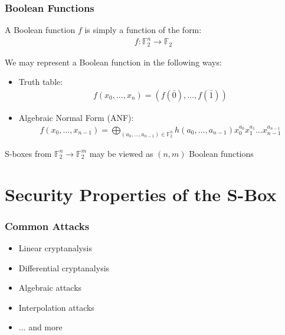 \documentclass[handout,10pt]{beamer}
\begin{document}
\begin{frame}
	\frametitle{Boolean Functions}
	A Boolean function $f$ is simply a function of the form:
	\begin{align*}
		f : \mathbb{F}_2^n \to \mathbb{F}_2
	\end{align*}

	\medskip
	\pause

	We may represent a Boolean function in the following ways:
	\begin{itemize}
		\item Truth table: 
		\begin{align*}
			f(x_0,\dots,x_n) = (f(\bar{0}), \dots, f(\bar{1}))
		\end{align*}
		\item Algebraic Normal Form (ANF): 
		\begin{align*}
			f(x_0,\dots,x_{n-1}) = \bigoplus_{(a_0,\dots,a_{n-1}) \in \mathbb{F}_2^n} h(a_0,\dots,a_{n-1})x_0^{a_0}x_1^{a_1}\dots x_{n-1}^{a_{n-1}}
		\end{align*}
	\end{itemize}

	\medskip
	\pause
	S-boxes from $\mathbb{F}_2^n \to \mathbb{F}_2^m$ may be viewed as $(n,m)$ Boolean functions
\end{frame}




\section{Security Properties of the S-Box}
\begin{frame}
	\frametitle{Common Attacks}
	\begin{itemize}
		\item Linear cryptanalysis
		\item Differential cryptanalysis
		\item Algebraic attacks
		\item Interpolation attacks
		\item ... and more
	\end{itemize}
\end{frame}
\end{document}
